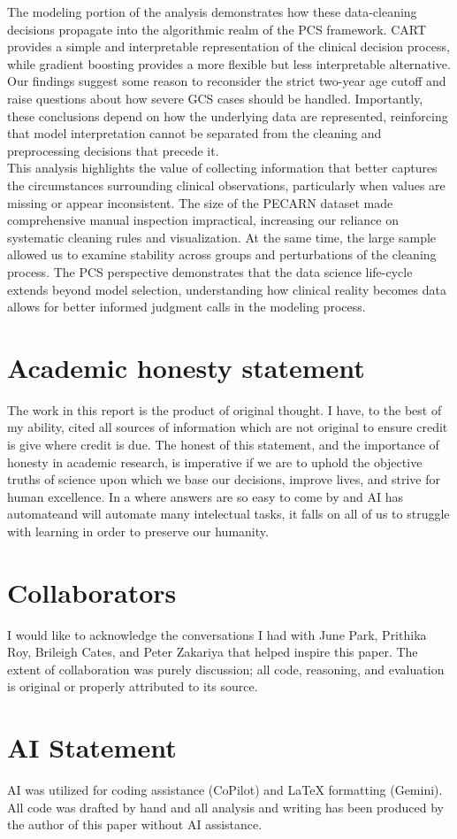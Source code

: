 \documentclass[10pt,letterpaper]{article}
\begin{document}
The modeling portion of the analysis demonstrates how these data-cleaning decisions propagate into the algorithmic realm of the PCS framework. CART provides a simple and interpretable representation of the clinical decision process, while gradient boosting provides a more flexible but less interpretable alternative. Our findings suggest some reason to reconsider the strict two-year age cutoff and raise questions about how severe GCS cases should be handled. Importantly, these conclusions depend on how the underlying data are represented, reinforcing that model interpretation cannot be separated from the cleaning and preprocessing decisions that precede it.\\

This analysis highlights the value of collecting information that better captures the circumstances surrounding clinical observations, particularly when values are missing or appear inconsistent. The size of the PECARN dataset made comprehensive manual inspection impractical, increasing our reliance on systematic cleaning rules and visualization. At the same time, the large sample allowed us to examine stability across groups and perturbations of the cleaning process. The PCS perspective demonstrates that the data science life-cycle extends beyond model selection, understanding how clinical reality becomes data allows for better informed judgment calls in the modeling process. 


\section{Academic honesty statement}\label{academic-honesty-statement}

The work in this report is the product of original thought. I have, to the best of my ability, cited all sources of information which are not original to ensure credit is give where credit is due. The honest of this statement, and the importance of honesty in academic research, is imperative if we are to uphold the objective truths of science upon which we base our decisions, improve lives, and strive for human excellence. In a where answers are so easy to come by and AI has automateand will automate many intelectual tasks, it falls on all of us to struggle with learning in order to preserve our humanity. 

\section{Collaborators}
I would like to acknowledge the conversations I had with June Park, Prithika Roy, Brileigh Cates, and Peter Zakariya that helped inspire this paper. The extent of collaboration was purely discussion; all code, reasoning, and evaluation is original or properly attributed to its source. 

\section{AI Statement}
AI was utilized for coding assistance (CoPilot) and LaTeX formatting (Gemini). All code was drafted by hand and all analysis and writing has been produced by the author of this paper without AI assistance.

\printbibliography
\end{document}
